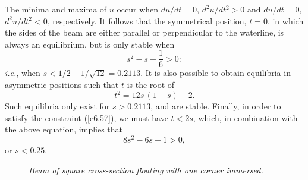 The minima and maxima of $u$ occur when $du/dt=0$, $d^2u/dt^2>0$ and $du/dt=0$, $d^2u/dt^2<0$, respectively.
It follows that the symmetrical position, $t=0$, in which the sides of the beam are either parallel or perpendicular to the
waterline, is always an equilibrium,  but is only stable when
\begin{equation}
s^2-s+\frac{1}{6}>0:
\end{equation}
{\em i.e.}, when $s<1/2-1/\sqrt{12}= 0.2113$. 
It is also possible to obtain equilibria in asymmetric positions such that $t$ is the root of
\begin{equation}
t^2= 12s\,(1-s)-2.
\end{equation}
Such equilibria only exist for $s>0.2113$, and are stable. Finally, in order to satisfy the  constraint (\ref{e6.57}), we
must have $t<2s$, which, in combination with the above equation, implies that
\begin{equation}
8s^2-6s +1>0,
\end{equation}
or $s<0.25$. 

\begin{figure}
\epsfysize=3in
\centerline{}
\caption{\em Beam of square cross-section floating with one corner immersed.}\label{f6.04}
\end{figure}

